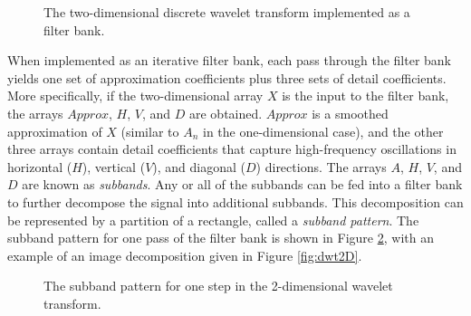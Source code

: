 \begin{figure}[h]
\begin{center}
\vspace{1cm}


\caption{The two-dimensional discrete wavelet transform implemented as a filter bank.}
\label{fig:filter bank2d}
\end{center}
\end{figure}

When implemented as an iterative filter bank, each pass through the filter bank yields one set of approximation coefficients plus three sets of detail coefficients.
More specifically, if the two-dimensional array $X$ is the input to the filter bank, the arrays $Approx$, $H$, $V$, and $D$ are obtained.
$Approx$ is a smoothed approximation of $X$ (similar to $A_n$ in the one-dimensional case), and the other three arrays contain detail coefficients that capture high-frequency oscillations in
horizontal ($H$), vertical ($V$), and diagonal ($D$) directions.
The arrays $A$, $H$, $V$, and $D$ are known as \emph{subbands}.
Any or all of the subbands can be fed into a filter bank to further decompose the signal into additional subbands.
This decomposition can be represented by a partition of a rectangle, called a \emph{subband pattern}.
The subband pattern for one pass of the filter bank is shown in Figure \ref{fig:2dsubbands}, with an example of an image decomposition given in Figure \ref{fig:dwt2D}.

\begin{figure}[H]
\caption{The subband pattern for one step in the 2-dimensional wavelet transform.}
\label{fig:2dsubbands}
\end{figure}

